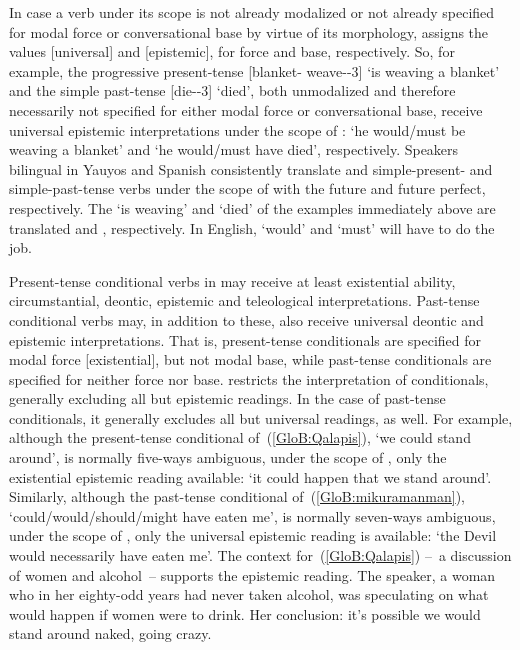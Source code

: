 In case a verb under its scope is not already modalized or not already specified for modal force or conversational base by virtue of its morphology,  assigns the values [universal] and [epistemic], for force and base, respectively. So, for example, the progressive present-tense   [blanket- weave--3] ‘is weaving a blanket’ and the simple past-tense  [die--3] ‘died’, both unmodalized and therefore necessarily not specified for either modal force or conversational base, receive universal epistemic interpretations under the scope of : ‘he would/must be weaving a blanket’ and ‘he would/must have died’, respectively. Speakers bilingual in Yauyos and Spanish consistently translate and simple-present- and simple-past-tense verbs under the scope of  with the future and future perfect, respectively. The  ‘is weaving’ and  ‘died’ of the examples immediately above are translated  and , respectively. In English, ‘would’ and ‘must’ will have to do the job.

Present-tense conditional verbs in \SYQ{} may receive at least existential ability, circumstantial, deontic, epistemic and teleological interpretations. Past-tense conditional verbs may, in addition to these, also receive universal deontic and epistemic interpretations. That is, present-tense conditionals are specified for modal force [existential], but not modal base, while past-tense conditionals are specified for neither force nor base.  restricts the interpretation of conditionals, generally excluding all but epistemic readings. In the case of past-tense conditionals, it generally excludes all but universal readings, as well. For example, although the present-tense conditional of~(\ref{GloB:Qalapis}),  ‘we could stand around’, is normally five-ways ambiguous, under the scope of , only the existential epistemic reading available: ‘it could happen that we stand around’. Similarly, although the past-tense conditional of~(\ref{GloB:mikuramanman}),   ‘could/would/should/might have eaten me’, is normally seven-ways ambiguous, under the scope of , only the universal epistemic reading is available: ‘the Devil would necessarily have eaten me’. The context for~(\ref{GloB:Qalapis}) --~a discussion of women and alcohol~-- supports the epistemic reading. The speaker, a woman who in her eighty-odd years had never taken alcohol, was speculating on what would happen if women were to drink. Her conclusion: it’s possible we would stand around naked, going crazy.\\

